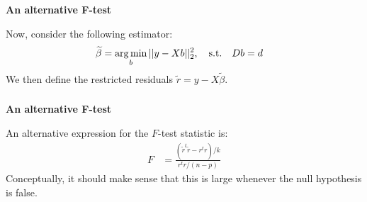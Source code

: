 \begin{frame}[fragile] \frametitle{}

{\bf An alternative F-test}

Now, consider the following estimator:
\begin{align*}
\widetilde{\beta} &= \mathop{\mathrm{arg\,min}}_b || y - Xb ||_2^2 , \quad \text{s.t.} \quad Db = d
\end{align*}
\pause We then define the restricted residuals
$\widetilde{r} = y - X\tilde{\beta}$.

\end{frame}

\begin{frame}[fragile] \frametitle{}

{\bf An alternative F-test}

An alternative expression for the $F$-test statistic is:
\begin{align*}
F &= \frac{(\tilde{r}^t \tilde{r} -  r^t r) / k }{r^t r / (n - p)}
\end{align*}
Conceptually, it should make sense that this is large whenever
the null hypothesis is false.

\end{frame}














